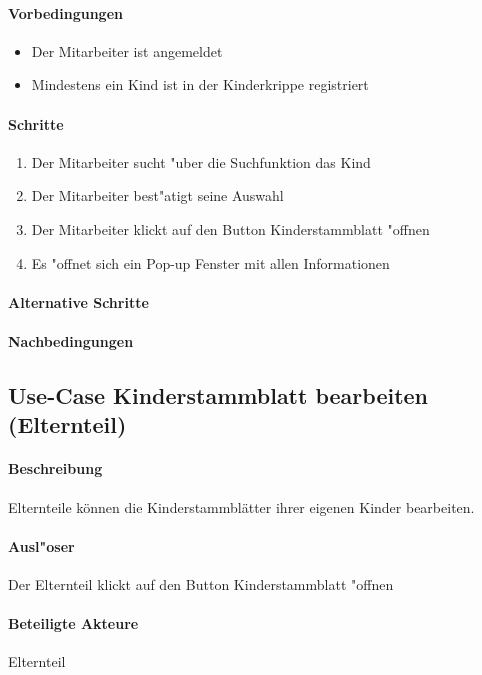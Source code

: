   \paragraph{Vorbedingungen}
  \begin{itemize}
   \item Der Mitarbeiter ist angemeldet
   \item Mindestens ein Kind ist in der Kinderkrippe registriert
  \end{itemize}

  \paragraph{Schritte}
  \begin{enumerate}
   \item Der Mitarbeiter sucht "uber die Suchfunktion das Kind
   \item Der Mitarbeiter best"atigt seine Auswahl
   \item Der Mitarbeiter klickt auf den Button \dq Kinderstammblatt "offnen\dq
   \item Es "offnet sich ein Pop-up Fenster mit allen Informationen
  \end{enumerate}
  
  \paragraph{Alternative Schritte}
  \paragraph{Nachbedingungen}
  
  
  
  
  \newpage
  \subsection{Use-Case Kinderstammblatt bearbeiten (Elternteil)}
  \paragraph{Beschreibung}
  Elternteile können die Kinderstammblätter ihrer eigenen Kinder bearbeiten. 
  \paragraph{Ausl"oser}
  Der Elternteil klickt auf den Button \dq Kinderstammblatt "offnen\dq
  \paragraph{Beteiligte Akteure}   \leavevmode \newline
  Elternteil
